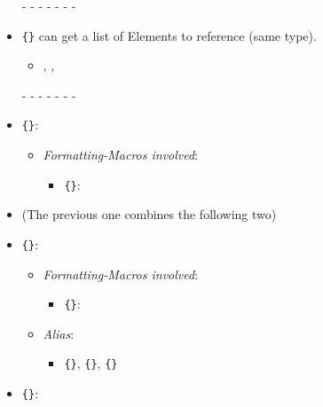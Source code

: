 \begin{itemize}
\begin{itemize}
\begin{itemize}
				\item \texttt{\{\}}, \texttt{\{\}}, \texttt{\{\}}
			\end{itemize}
		\end{itemize}
	\item[-]- - - - - -
	\item \texttt{\{\}} can get a list of Elements to reference (same type).
		\begin{itemize}
			\item {}, , 
		\end{itemize}
	\item[-]- - - - - -
	\item \texttt{\{\}}: 
		\begin{itemize}
			\item \textit{Formatting-Macros involved}:
			\begin{itemize}
				\item \texttt{\{\}}: 
			\end{itemize}
		\end{itemize}
	\item (The previous one combines the following two)
	\item \texttt{\{\}}: 
		\begin{itemize}
			\item \textit{Formatting-Macros involved}:
			\begin{itemize}
				\item \texttt{\{\}}: 
			\end{itemize}
			\item \textit{Alias}:
			\begin{itemize}
				\item \texttt{\{\}}, \texttt{\{\}}, \texttt{\{\}}
			\end{itemize}
		\end{itemize}
	\item \texttt{\{\}}: 
		\begin{itemize}

\end{itemize}
\end{itemize}
